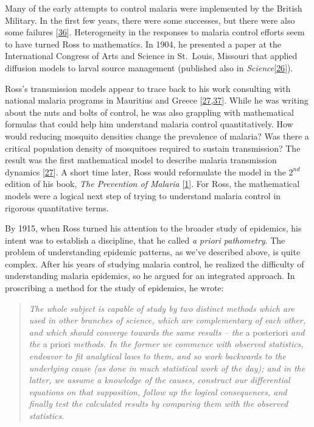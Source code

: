 \documentclass[
]{book}
\begin{document}
Many of the early attempts to control malaria were implemented by the British Military. In the first few years, there were some successes, but there were also some failures {[}\protect\hyperlink{ref-RossR1907PreventionMalaria}{36}{]}. Heterogeneity in the responses to malaria control efforts seem to have turned Ross to mathematics. In 1904, he presented a paper at the International Congress of Arts and Science in St.~Louis, Missouri that applied diffusion models to larval source management (published also in \emph{Science}{[}\protect\hyperlink{ref-RossR1905LogicalBasis}{26}{]}).

Ross's transmission models appear to trace back to his work consulting with national malaria programs in Mauritius and Greece {[}\protect\hyperlink{ref-RossR1908}{27},\protect\hyperlink{ref-RossR1909}{37}{]}. While he was writing about the nuts and bolts of control, he was also grappling with mathematical formulas that could help him understand malaria control quantitatively. How would reducing mosquito densities change the prevalence of malaria? Was there a critical population density of mosquitoes required to sustain transmission? The result was the first mathematical model to describe malaria transmission dynamics {[}\protect\hyperlink{ref-RossR1908}{27}{]}. A short time later, Ross would reformulate the model in the \(2^{nd}\) edition of his book, \emph{The Prevention of Malaria} {[}\protect\hyperlink{ref-RossR1911Book}{1}{]}. For Ross, the mathematical models were a logical next step of trying to understand malaria control in rigorous quantitative terms.

By 1915, when Ross turned his attention to the broader study of epidemics, his intent was to establish a discipline, that he called \emph{a priori pathometry}. The problem of understanding epidemic patterns, as we've described above, is quite complex. After his years of studying malaria control, he realized the difficulty of understanding malaria epidemics, so he argued for an integrated approach. In proscribing a method for the study of epidemics, he wrote:

\begin{quote}
\emph{The whole subject is capable of study by two distinct methods which are used in other branches of science, which are complementary of each other, and which should converge towards the same results -- the} a posteriori \emph{and the} a priori \emph{methods. In the former we commence with observed statistics, endeavor to fit analytical laws to them, and so work backwards to the underlying cause (as done in much statistical work of the day); and in the latter, we assume a knowledge of the causes, construct our differential equations on that supposition, follow up the logical consequences, and finally test the calculated results by comparing them with the observed statistics.}
\end{quote}
\end{document}
